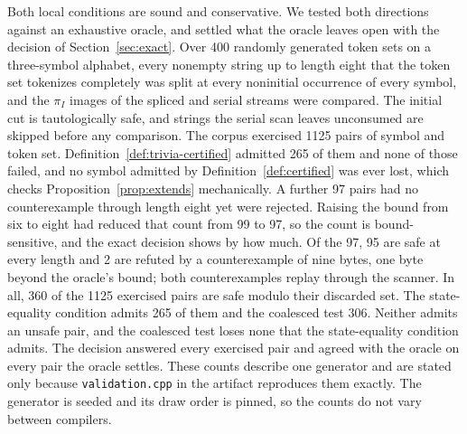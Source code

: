 \documentclass[11pt,a4paper]{article}
\theoremstyle{definition}
\theoremstyle{plain}
\newcommand{\code}[1]{\texttt{#1}}
\begin{document}
Both local conditions are sound and conservative. We tested both directions against an exhaustive oracle, and settled
what the oracle leaves open with the decision of Section~\ref{sec:exact}. Over 400 randomly generated token sets on a
three-symbol alphabet, every nonempty string up to length eight that the token set tokenizes completely was split at
every noninitial occurrence of every symbol, and the $\pi_I$ images of the spliced and serial streams were compared. The
initial cut is tautologically safe, and strings the serial scan leaves unconsumed are skipped before any comparison. The
corpus exercised 1125 pairs of symbol and token set. Definition~\ref{def:trivia-certified} admitted 265 of them and none
of those failed, and no symbol admitted by Definition~\ref{def:certified} was ever lost, which checks
Proposition~\ref{prop:extends} mechanically. A further 97 pairs had no counterexample through length eight yet were
rejected. Raising the bound from six to eight had reduced that count from 99 to 97, so the count is bound-sensitive, and
the exact decision shows by how much. Of the 97, 95 are safe at every length and 2 are refuted by a counterexample of
nine bytes, one byte beyond the oracle's bound; both counterexamples replay through the scanner. In all, 360 of the 1125
exercised pairs are safe modulo their discarded set. The state-equality condition admits 265 of them and the coalesced
test 306. Neither admits an unsafe pair, and the coalesced test loses none that the state-equality condition admits. The
decision answered every exercised pair and agreed with the oracle on every pair the oracle settles. These counts
describe one generator and are stated only because \code{validation.cpp} in the artifact reproduces them exactly. The
generator is seeded and its draw order is pinned, so the counts do not vary between compilers.
\end{document}
